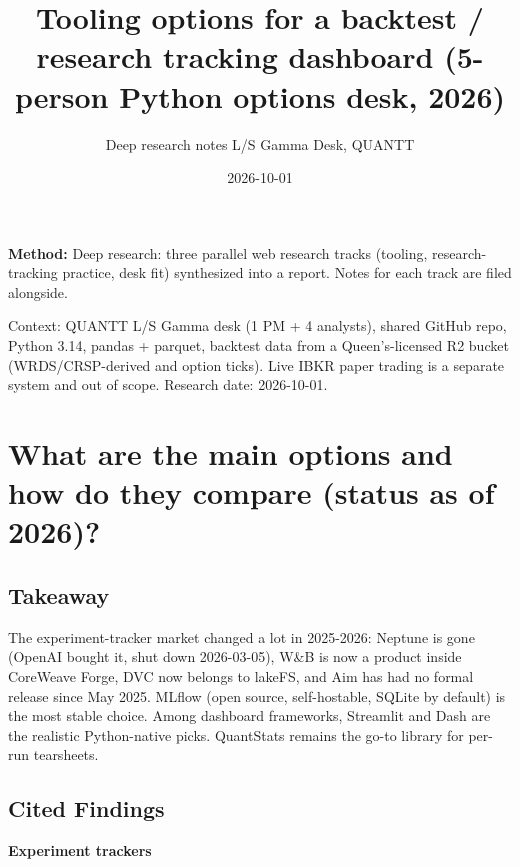 \documentclass{article}
\title{Tooling options for a backtest /\allowbreak{} research tracking dashboard (5-person Python options desk, 2026)}
\author{Deep research notes \textperiodcentered{} L/S Gamma Desk, QUANTT}
\date{2026-10-01}
\begin{document}
\maketitle

\textbf{Method:} Deep research: three parallel web research tracks (tooling, research-tracking practice, desk fit) synthesized into a report. Notes for each track are filed alongside.

Context: QUANTT L/\allowbreak{}S Gamma desk (1 PM + 4 analysts), shared GitHub repo, Python 3.14, pandas + parquet, backtest data from a Queen's-licensed R2 bucket (WRDS/\allowbreak{}CRSP-derived and option ticks). Live IBKR paper trading is a separate system and out of scope. Research date: 2026-10-01.

\section{What are the main options and how do they compare (status as of 2026)?}

\subsection{Takeaway}

The experiment-tracker market changed a lot in 2025-2026: Neptune is gone (OpenAI bought it, shut down 2026-03-05), W\&B is now a product inside CoreWeave Forge, DVC now belongs to lakeFS, and Aim has had no formal release since May 2025. MLflow (open source, self-hostable, SQLite by default) is the most stable choice. Among dashboard frameworks, Streamlit and Dash are the realistic Python-native picks. QuantStats remains the go-to library for per-run tearsheets.

\subsection{Cited Findings}

\textbf{Experiment trackers}
\end{document}

